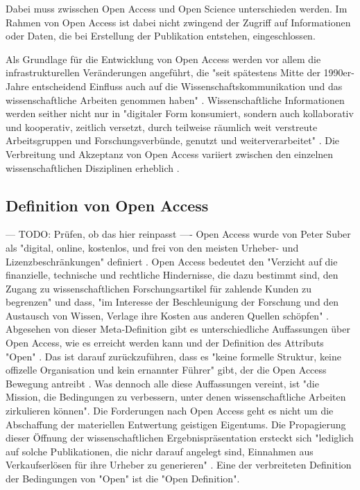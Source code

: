 Dabei muss zwisschen Open Access und Open Science unterschieden werden. Im Rahmen von Open Access ist dabei nicht zwingend der Zugriff auf Informationen oder Daten, die bei Erstellung der Publikation entstehen, eingeschlossen. 

Als Grundlage für die Entwicklung von Open Access werden vor allem die infrastrukturellen Veränderungen angeführt, die "seit spätestens Mitte der 1990er-Jahre entscheidend Einfluss auch auf die Wissenschaftskommunikation und das wissenschaftliche Arbeiten genommen haben" \cite{schulze_2013_open}. Wissenschaftliche Informationen werden seither nicht nur in "digitaler Form konsumiert, sondern auch kollaborativ und kooperativ, zeitlich versetzt, durch teilweise räumlich weit verstreute Arbeitsgruppen und Forschungsverbünde, genutzt und weiterverarbeitet" \cite{schulze_2013_open}. Die Verbreitung und Akzeptanz von Open Access variiert zwischen den einzelnen wissenschaftlichen Disziplinen erheblich \cite{cite:21a}.

\subsection{Definition von Open Access}
--- TODO: Prüfen, ob das hier reinpasst ----
Open Access wurde von Peter Suber als "digital, online, kostenlos, und frei von den meisten Urheber- und Lizenzbeschränkungen" \cite{suber_2012_open} definiert \cite{Adema_2014_open_access}. Open Access bedeutet den "Verzicht auf die finanzielle, technische und rechtliche Hindernisse, die dazu bestimmt sind, den Zugang zu wissenschaftlichen Forschungsartikel für zahlende Kunden zu begrenzen" und dass, "im Interesse der Beschleunigung der Forschung und den Austausch von Wissen, Verlage ihre Kosten aus anderen Quellen schöpfen" \cite{Suber_2002}. Abgesehen von dieser Meta-Definition gibt es unterschiedliche Auffassungen über Open Access, wie es erreicht werden kann und der Definition des Attributs "Open" \cite{Adema_2014_open_access}. Das ist darauf zurückzuführen, dass es "keine formelle Struktur, keine offizelle Organisation und kein ernannter Führer" gibt, der die Open Access Bewegung antreibt \cite{poynder_2011_suber}. Was dennoch alle diese Auffassungen vereint, ist "die Mission, die Bedingungen zu verbessern, unter denen wissenschaftliche Arbeiten zirkulieren können"\cite{Adema_2014_open_access}. Die Forderungen nach Open Access geht es nicht um die Abschaffung der materiellen Entwertung geistigen Eigentums. Die Propagierung dieser Öffnung der wissenschaftlichen Ergebnispräsentation ersteckt sich "lediglich auf solche Publikationen, die nichr darauf angelegt sind, Einnahmen aus Verkaufserlösen für ihre Urheber zu generieren" \cite{muller_2010_open}. Eine der verbreiteten Definition der Bedingungen von "Open" ist die "Open Definition".

